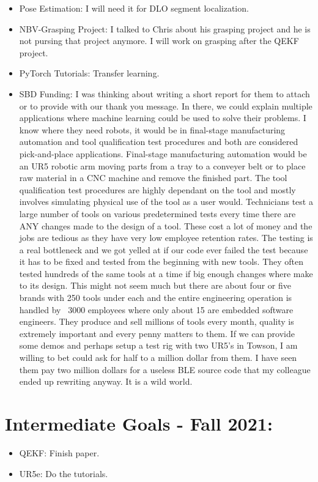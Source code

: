 \documentclass[11pt]{article}
\begin{document}
\begin{itemize}
    \item Pose Estimation: I will need it for DLO segment localization.
    \item NBV-Grasping Project: I talked to Chris about his grasping project
    and he is not pursing that project anymore. I will work on grasping after
    the QEKF project.
    \item PyTorch Tutorials: Transfer learning.
    \item SBD Funding: I was thinking about writing a short report for them to
    attach or to provide with our thank you message. In there, we could explain
    multiple applications where machine learning could be used to solve their
    problems. I know where they need robots, it would be in final-stage
    manufacturing automation and tool qualification test procedures and both
    are considered pick-and-place applications. Final-stage
    manufacturing automation would be an UR5 robotic arm moving parts from a
    tray to a conveyer belt or to place raw material in a CNC machine and
    remove the finished part. The tool qualification test procedures are
    highly dependant on the tool and mostly involves simulating physical use of
    the tool as a user would. Technicians test a large number of tools on
    various predetermined tests every time there are ANY changes made to the
    design of a tool. These cost a lot of money and the jobs are tedious as
    they have very low employee retention rates. The testing is a real
    bottleneck and we got yelled at if our code ever failed the test because
    it has to be fixed and tested from the beginning with new tools. They often
    tested hundreds of the same tools at a time if big enough changes where
    make to its design. This might
    not seem much but there are about four or five brands with 250 tools under
    each and the entire engineering operation is handled by ~3000 employees
    where only about 15 are embedded software engineers.
    They produce and sell millions of tools every month, quality is extremely
    important and every penny matters to them.
    If we can provide some demos and perhaps setup
    a test rig with two UR5's in Towson, I am willing to bet could ask for
    half to a million dollar from them. I have seen them pay two million dollars
    for a useless BLE source code that my colleague ended up rewriting anyway.
    It is a wild world.
  \end{itemize}

\section{Intermediate Goals - Fall 2021:}
\begin{itemize}
      \item QEKF: Finish paper.
      \item UR5e: Do the tutorials.
\end{itemize}

\newpage

\newpage


\end{document}
